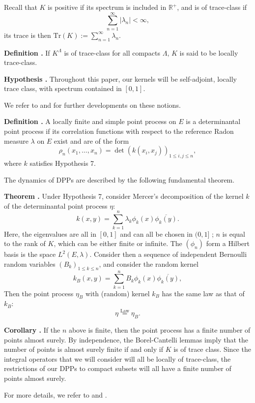 \documentclass[11pt]{article}
\newcounter{cnt}
\newcommand{\cnt}{\thecnt \stepcounter{cnt}}
\begin{document}
Recall that $K$ is positive if its spectrum is included in $\mathbb{R}^+$, and is of trace-class if $$ \sum_{n=1}^\infty |\lambda_n| < \infty,$$ its trace is then $\mathrm{Tr}(K) := \sum_{n=1}^\infty \lambda_n$.

\textbf{Definition \cnt.} If $K^\Lambda$ is of trace-class for all compacts $\Lambda$, $K$ is said to be locally trace-class.

\textbf{Hypothesis \cnt.} Throughout this paper, our kernels will be self-adjoint, locally trace class, with spectrum contained in $[0, 1]$.

We refer to \cite{ConwayOpTheory2000} and \cite{ConwayFunctAnalysis2019} for further developments on these notions.

\textbf{Definition \cnt.} A locally finite and simple point process on $E$ is a determinantal point process if its correlation functions with respect to the reference Radon measure $\lambda$ on $E$ exist and are of the form $$ \rho_n(x_1, \dots, x_n) = \det(k(x_i, x_j))_{1 \le i,j \le n}, $$ where $k$ satisfies Hypothesis 7.

The dynamics of DPPs are described by the following fundamental theorem.

\textbf{Theorem \cnt.} Under Hypothesis 7, consider Mercer's decomposition of the kernel $k$ of the determinantal point process $\eta$:
\[
k(x,y) = \sum_{k=1}^n \lambda_k \phi_k(x) \overline{\phi_k(y)}.
\]
Here, the eigenvalues are all in $[0,1]$ and can all be chosen in $(0,1]$ ; $n$ is equal to the rank of $K$, which can be either finite or infinite. The $(\phi_n)$ form a Hilbert basis is the space $L^2(E, \lambda)$. Consider then a sequence of independent Bernoulli random variables $(B_k)_{1 \le k \le n}$, and consider the random kernel
\[
k_B(x, y) = \sum_{k=1}^n B_k \phi_k(x) \overline{\phi_k(y)},
\]
Then the point process $\eta_B$ with (random) kernel $k_B$ has the same law as that of $k_B$:
\[
\eta \overset{\text{Law}}{=} \eta_B.
\]

\textbf{Corollary \cnt.} If the $n$ above is finite, then the point process has a finite number of points almost surely. By independence, the Borel-Cantelli lemmas imply that the number of points is almost surely finite if and only if $K$ is of trace class. Since the integral operators that we will consider will all be locally of trace-class, the restrictions of our DPPs to compact subsets will all have a finite number of points almost surely.

For more details, we refer to \cite{Hough2006} and \cite{ShiraiTakahashi2003}.
\end{document}
